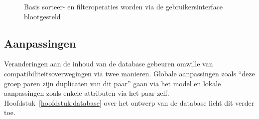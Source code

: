 \begin{figure}[ht]
  \centering
  \hfill%
  \caption{Basis sorteer- en filteroperaties worden via de gebruikersinterface blootgesteld}
  \label{fig:tangfiltersort}
\end{figure}


\subsection{Aanpassingen}
Veranderingen aan de inhoud van de database gebeuren omwille van compatibiliteitsoverwegingen via twee manieren. Globale aanpassingen zoals ``deze groep paren zijn duplicaten van dit paar'' gaan via het model en lokale aanpassingen zoals enkele attributen via het paar zelf. Hoofdstuk~\ref{hoofdstuk:database} over het ontwerp van de database licht dit verder toe.

